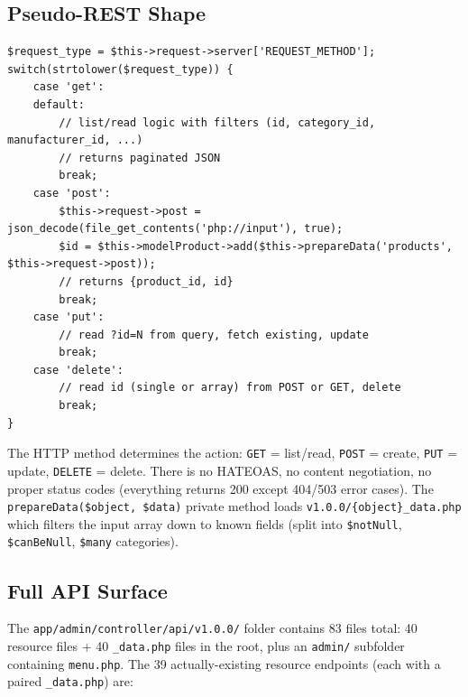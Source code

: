 \documentclass[11pt,a4paper]{article}
\begin{document}
\subsection{Pseudo-REST Shape}

\begin{lstlisting}[caption={\texttt{v1.0.0/products.php} --- the pseudo-REST shape (abridged).},label={lst:api-rest}]
$request_type = $this->request->server['REQUEST_METHOD'];
switch(strtolower($request_type)) {
    case 'get':
    default:
        // list/read logic with filters (id, category_id, manufacturer_id, ...)
        // returns paginated JSON
        break;
    case 'post':
        $this->request->post = json_decode(file_get_contents('php://input'), true);
        $id = $this->modelProduct->add($this->prepareData('products', $this->request->post));
        // returns {product_id, id}
        break;
    case 'put':
        // read ?id=N from query, fetch existing, update
        break;
    case 'delete':
        // read id (single or array) from POST or GET, delete
        break;
}
\end{lstlisting}

The HTTP method determines the action: \texttt{GET} = list/read,
\texttt{POST} = create, \texttt{PUT} = update, \texttt{DELETE} =
delete. There is no HATEOAS, no content negotiation, no proper
status codes (everything returns 200 except 404/503 error cases).
The \texttt{prepareData(\$object, \$data)} private method loads
\texttt{v1.0.0/\{object\}\_data.php} which filters the input array
down to known fields (split into \texttt{\$notNull},
\texttt{\$canBeNull}, \texttt{\$many} categories).

\subsection{Full API Surface}

The \texttt{app/admin/controller/api/v1.0.0/} folder contains 83
files total: 40 resource files + 40 \texttt{\_data.php} files in
the root, plus an \texttt{admin/} subfolder containing
\texttt{menu.php}. The 39 actually-existing resource endpoints
(each with a paired \texttt{\_data.php}) are:
\end{document}
